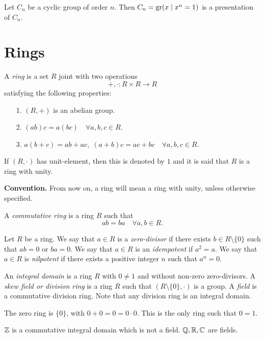 \begin{example}
Let $C_n$ be a cyclic group of order $n$. Then $C_n=\operatorname{gr}(x\mid x^n=1)$ is a presentation of $C_n$.
\end{example}


\section*{Rings}

A {\em ring} is a set $R$ joint with two operations
$$+,\cdot\colon R\times R\rightarrow R$$
satisfying the following properties:
\begin{itemize}
	\item[1.] $(R,+)$ is an abelian group.
	\item[2.] $(ab)c=a(bc)\quad\forall a,b,c\in R$.
    \item[3.] $a(b+c)=ab+ac,\; (a+b)c=ac+bc\quad\forall a,b,c\in R$.
\end{itemize}
If $(R,\cdot)$ has unit-element, then this is denoted by $1$ and it is said that $R$ is a ring with unity.
\bigskip

{\bf Convention.} From now on, a ring will mean a ring with unity, unless otherwise specified. 
\bigskip

A {\em commutative ring} is a ring $R$ such that
$$ab=ba\quad\forall a,b\in R.$$

Let $R$ be a ring. We say that $a\in R$ is a {\em zero-divisor} if there exists $b\in R\setminus\{0\}$ such that $ab=0$ or $ba=0$. We say that $a\in R$ is an {\em idempotent} if $a^2=a$. We say that $a\in R$ is {\em nilpotent} if there exists a positive integer $n$ such that $a^n=0$.  

An {\em integral domain} is a ring $R$ with $0\neq 1$ and without non-zero zero-divisors.
A {\em skew field or division ring} is a ring $R$ such that $(R\setminus \{0\},\cdot)$ is a group. 
A {\em field} is a commutative division ring. Note that any division ring is an integral domain.

\begin{example} The zero ring is $\{0\}$, with $0+0=0=0\cdot 0$. This is the only ring such that $0=1$.
\end{example}

\begin{example}
 $\mathbb{Z}$ is a commutative integral domain which is not a field.
 $\mathbb{Q},\mathbb{R},\mathbb{C}$ are fields.
 \end{example}


